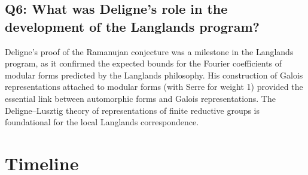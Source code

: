 \subsection*{Q6: What was Deligne's role in the development of the Langlands program?}

Deligne's proof of the Ramanujan conjecture was a milestone in the Langlands program, as it confirmed the expected bounds for the Fourier coefficients of modular forms predicted by the Langlands philosophy. His construction of Galois representations attached to modular forms (with Serre for weight 1) provided the essential link between automorphic forms and Galois representations. The Deligne--Lusztig theory of representations of finite reductive groups is foundational for the local Langlands correspondence.

\section*{Timeline}
